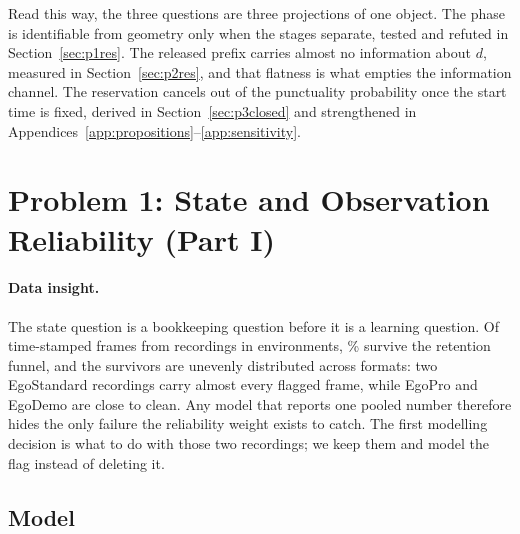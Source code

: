 \documentclass{swmcmthesis}
\begin{document}
Read this way, the three questions are three projections of one object. The phase is
identifiable from geometry only when the stages separate, tested and refuted in
Section~\ref{sec:p1res}. The released prefix carries almost no information about $d$,
measured in Section~\ref{sec:p2res}, and that flatness is what empties the information
channel. The reservation cancels out of the punctuality probability once the start time is
fixed, derived in Section~\ref{sec:p3closed} and strengthened in
Appendices~\ref{app:propositions}--\ref{app:sensitivity}.

\section{Problem 1: State and Observation Reliability (Part I)}
\label{sec:partone}

\paragraph{Data insight.} The state question is a bookkeeping question before it is a
learning question. Of \slotDataNFrames{} time-stamped frames from \slotNRecords{}
recordings in \slotNEnv{} environments, \slotPStateRetRate{}\% survive the retention
funnel, and the survivors are unevenly distributed across formats: two EgoStandard
recordings carry almost every flagged frame, while EgoPro and EgoDemo are close to
clean. Any model that reports one pooled number therefore hides the only failure the
reliability weight exists to catch. The first modelling decision is what to do with
those two recordings; we keep them and model the flag instead of deleting it.

\subsection{Model}
\label{sec:p1model}
\end{document}
